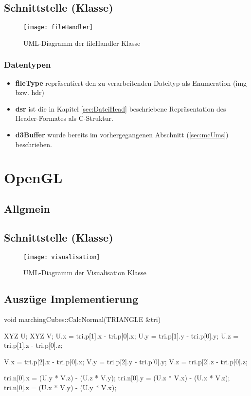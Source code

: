 \subsection{Schnittstelle (Klasse)}
\begin{figure}[H]
	\centering
	\texttt{[image: fileHandler]}
	\caption{UML-Diagramm der fileHandler Klasse}
	\label{fig:fileHandler}
\end{figure}
\subsubsection{Datentypen}
\begin{itemize}
	\item \textbf{fileType} repräsentiert den zu verarbeitenden Dateityp als Enumeration (img bzw. hdr) 
	\item \textbf{dsr} ist die in Kapitel \ref{sec:DateiHead} beschriebene Repräsentation des Header-Formates als C-Struktur.
	\item \textbf{d3Buffer} wurde bereits im vorhergegangenen Abschnitt (\ref{sec:mcUms}) beschrieben.
\end{itemize}

\section{OpenGL}
\subsection{Allgmein}
\subsection{Schnittstelle (Klasse)}
\begin{figure}[H]
	\centering
	\texttt{[image: visualisation]}
	\caption{UML-Diagramm der Visualisation Klasse}
	\label{fig:visualisation}
\end{figure}

\subsection{Auszüge Implementierung}
\begin{program}
	\caption{Berechnung der Normalen eines Dreiecks}
	\label{prog:calcNormal}
\begin{CCode}
	void marchingCubes::CalcNormal(TRIANGLE &tri){
		XYZ U;
		XYZ V;
		U.x = tri.p[1].x - tri.p[0].x;
		U.y = tri.p[1].y - tri.p[0].y;
		U.z = tri.p[1].z - tri.p[0].z;
		
		V.x = tri.p[2].x - tri.p[0].x;
		V.y = tri.p[2].y - tri.p[0].y;
		V.z = tri.p[2].z - tri.p[0].z;
		
		tri.n[0].x = (U.y * V.z) - (U.z * V.y);
		tri.n[0].y = (U.z * V.x) - (U.x * V.z);
		tri.n[0].z = (U.x * V.y) - (U.y * V.x);
	}
\end{CCode}
\end{program}

